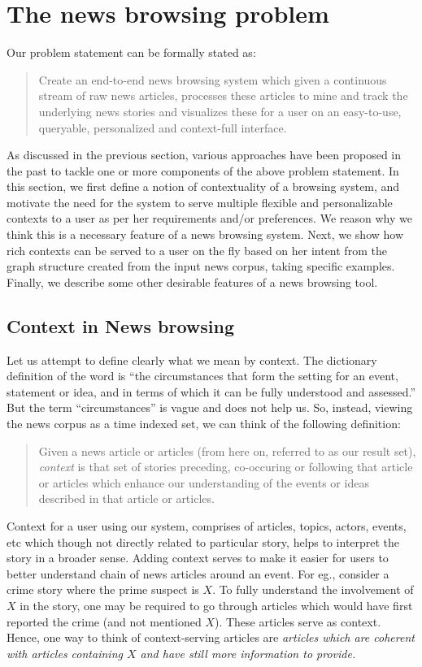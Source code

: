 \section{The news browsing problem}
\label{sec:newsgraph}

Our problem statement can be formally stated as:
\begin{quote}
  Create an end-to-end news browsing system which given a
  continuous stream of raw news articles, processes these articles to
  mine and track the underlying news stories and visualizes these for
  a user on an easy-to-use, queryable, personalized and context-full
  interface.
\end{quote}
As discussed in the previous section, various approaches have been proposed in the past to tackle one or more components of the above problem
statement. In this section, we first define a notion of contextuality of a browsing system, and motivate the need for the system to serve multiple flexible and personalizable contexts to a user as per her
requirements and/or preferences. We reason why we think this is a necessary feature of a news browsing system. Next, we show how rich contexts can be served to a user on the fly based on her intent
from the graph structure created from the input news corpus, taking specific examples. 
Finally, we describe some other desirable features of a news browsing tool. 

\subsection{Context in News browsing}
Let us attempt to define clearly what we mean by context. The
dictionary definition of the word is ``the circumstances that form the
setting for an event, statement or idea, and in terms of which it can
be fully understood and assessed.'' But the term ``circumstances'' is
vague and does not help us. So, instead, viewing the news corpus as a
time indexed set, we can think of the following definition: 
\begin{quote}
Given a news article or articles (from here on, referred to as our result set), {\em context} is that set of stories
preceding, co-occuring or following that article or articles which
enhance our understanding of the events or ideas described in that
article or articles.
\end{quote}

Context for a user using our system, comprises of articles, topics,
actors, events, etc which though not directly related to particular
story, helps to interpret the story in a broader sense.  Adding
context serves to make it easier for users to better understand chain
of news articles around an event. For eg., consider a crime story
where the prime suspect is $X$. To fully understand the involvement of $X$ in the story,
one may be required to go through articles which would have first reported the crime (and not 
mentioned $X$). These articles serve as context. Hence, one way to think of context-serving articles
are \emph{articles which are coherent with articles containing $X$ and have still more information to provide.}

